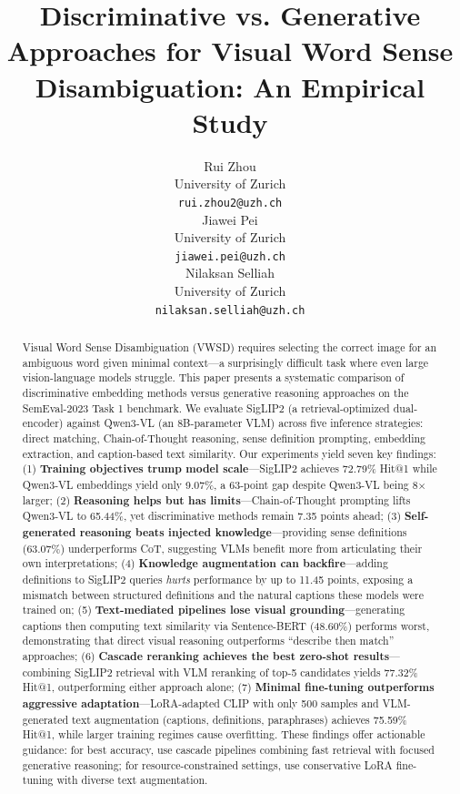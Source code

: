 \documentclass[11pt]{article}
\title{Discriminative vs. Generative Approaches for Visual Word Sense Disambiguation: An Empirical Study}
\author{Rui Zhou \\
  University of Zurich\\
  \texttt{rui.zhou2@uzh.ch} \\\And
  Jiawei Pei \\
  University of Zurich\\
  \texttt{jiawei.pei@uzh.ch} \\\And
  Nilaksan Selliah \\
  University of Zurich\\
  \texttt{nilaksan.selliah@uzh.ch} \\}
\begin{document}
\maketitle
\begin{abstract}
Visual Word Sense Disambiguation (VWSD) requires selecting the correct image for an ambiguous word given minimal context---a surprisingly difficult task where even large vision-language models struggle. This paper presents a systematic comparison of discriminative embedding methods versus generative reasoning approaches on the SemEval-2023 Task 1 benchmark. We evaluate SigLIP2 (a retrieval-optimized dual-encoder) against Qwen3-VL (an 8B-parameter VLM) across five inference strategies: direct matching, Chain-of-Thought reasoning, sense definition prompting, embedding extraction, and caption-based text similarity. Our experiments yield seven key findings: (1) \textbf{Training objectives trump model scale}---SigLIP2 achieves 72.79\% Hit@1 while Qwen3-VL embeddings yield only 9.07\%, a 63-point gap despite Qwen3-VL being 8$\times$ larger; (2) \textbf{Reasoning helps but has limits}---Chain-of-Thought prompting lifts Qwen3-VL to 65.44\%, yet discriminative methods remain 7.35 points ahead; (3) \textbf{Self-generated reasoning beats injected knowledge}---providing sense definitions (63.07\%) underperforms CoT, suggesting VLMs benefit more from articulating their own interpretations; (4) \textbf{Knowledge augmentation can backfire}---adding definitions to SigLIP2 queries \textit{hurts} performance by up to 11.45 points, exposing a mismatch between structured definitions and the natural captions these models were trained on; (5) \textbf{Text-mediated pipelines lose visual grounding}---generating captions then computing text similarity via Sentence-BERT (48.60\%) performs worst, demonstrating that direct visual reasoning outperforms ``describe then match'' approaches; (6) \textbf{Cascade reranking achieves the best zero-shot results}---combining SigLIP2 retrieval with VLM reranking of top-5 candidates yields 77.32\% Hit@1, outperforming either approach alone; (7) \textbf{Minimal fine-tuning outperforms aggressive adaptation}---LoRA-adapted CLIP with only 500 samples and VLM-generated text augmentation (captions, definitions, paraphrases) achieves 75.59\% Hit@1, while larger training regimes cause overfitting. These findings offer actionable guidance: for best accuracy, use cascade pipelines combining fast retrieval with focused generative reasoning; for resource-constrained settings, use conservative LoRA fine-tuning with diverse text augmentation.
\end{abstract}
\end{document}
